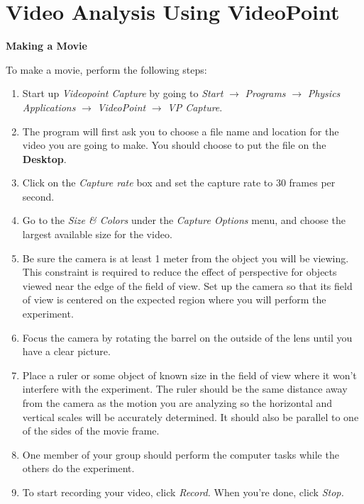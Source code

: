 
\section{Video Analysis Using VideoPoint}
\label{videopoint}
\textbf{Making a Movie} 

To make a movie, perform the following steps:

\begin{enumerate}
\item Start up \textit{Videopoint Capture} by
going to \textit{Start} $\rightarrow$ \textit{Programs} $\rightarrow$
\textit{Physics Applications} $\rightarrow$ \textit{VideoPoint}
$\rightarrow$ \textit{VP Capture}.

\item The program will first ask you to choose a file name and location for 
the video you are going to make.  You should choose to put the file
on the \textbf{Desktop}.

\item Click on the \textit{Capture rate}
box and set the capture rate to 30 frames per second. 

\item Go to the \textit{Size \& Colors} under the \textit{Capture Options} 
menu, and choose the largest available size for the video.



\item Be sure the camera is at least 1 meter from the object
you will be viewing. This constraint is required to reduce the effect
of perspective for objects viewed near the edge of the field of view.
Set up the camera so that its field of view is centered on the expected
region where you will perform the experiment. 
\item Focus the camera by rotating the barrel on the outside
of the lens until you have a clear picture.
\item Place a ruler or some
object of known size in the field of view where it won't interfere
with the experiment. The ruler should be the same distance away from
the camera as the motion you are analyzing so the horizontal and vertical 
scales will be accurately determined. It should also be parallel to one of the
sides of the movie frame.
\item One member of your group should perform the computer tasks while the
others do the experiment. 
\item To start recording your video, click \textit{Record.}  When
you're done, click \textit{Stop.}


\end{enumerate}
